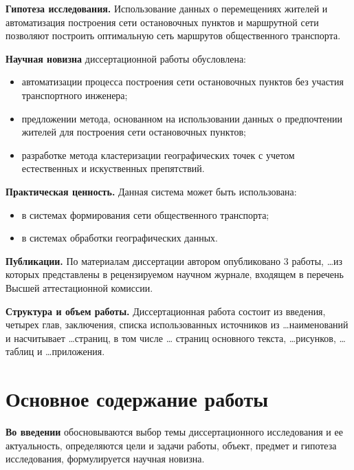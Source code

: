 \textbf{Гипотеза исследования.} Использование данных о перемещениях жителей и автоматизация построения сети остановочных пунктов и маршрутной сети позволяют построить оптимальную сеть маршрутов общественного транспорта.

\textbf{Научная новизна} диссертационной работы обусловлена:
\begin{itemize}
    \item автоматизации процесса построения сети остановочных пунктов без участия транспортного инженера;
    \item предложении метода, основанном на использовании данных о предпочтении жителей для построения сети остановочных пунктов;
    \item разработке метода кластеризации географических точек с учетом естественных и искуственных препятствий.
\end{itemize}

\textbf{Практическая ценность.} Данная система может быть использована:
\begin{itemize}
    \item в системах формирования сети общественного транспорта;
    \item в системах обработки географических данных.
\end{itemize}

\textbf{Публикации.} По материалам диссертации автором опубликовано 3 работы, \ldots из которых представлены 
в рецензируемом научном журнале, входящем в перечень Высшей аттестационной комиссии. 

\textbf{Структура и объем работы.} Диссертационная работа состоит из введения, четырех глав, заключения, 
списка использованных источников из \ldots наименований и насчитывает \ldots страниц, в том числе \ldots 
страниц основного текста, \ldots рисунков, \ldots таблиц и \ldots приложения.

\section{Основное содержание работы}
\textbf{Во введении} обосновываются выбор темы диссертационного исследования и ее актуальность, определяются 
цели и задачи работы, объект, предмет и гипотеза исследования, формулируется научная новизна.

